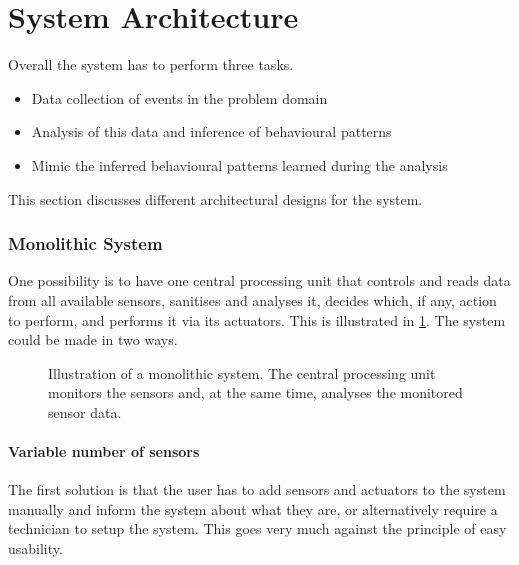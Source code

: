 \section{System Architecture}\label{sec:architecture}

Overall the system has to perform three tasks.

\begin{itemize}
\item Data collection of events in the problem domain
\item Analysis of this data and inference of behavioural patterns
\item Mimic the inferred behavioural patterns learned during the analysis
\end{itemize}
This section discusses different architectural designs for the system.

\subsubsection{Monolithic System}
One possibility is to have one central processing unit that controls and reads data  from all available sensors, sanitises and analyses it, decides which, if any, action to perform, and performs it via its actuators. This is illustrated in \cref{fig:monolithic_system}. The system could be made in two ways.

\begin{figure}[htbp]
\centering
{}
\caption[Monolithic system]{Illustration of a monolithic system. The central processing unit monitors the sensors and, at the same time, analyses the monitored sensor data.}\label{fig:monolithic_system}
\end{figure}

\paragraph{Variable number of sensors}
The first solution is that the user has to add sensors and actuators to the system manually and inform the system about what they are, or alternatively require a technician to setup the system. This goes very much against the principle of easy usability.


